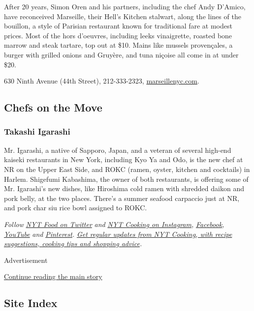 After 20 years, Simon Oren and his partners, including the chef Andy
D'Amico, have reconceived Marseille, their Hell's Kitchen stalwart,
along the lines of the bouillon, a style of Parisian restaurant known
for traditional fare at modest prices. Most of the hors d'oeuvres,
including leeks vinaigrette, roasted bone marrow and steak tartare, top
out at \$10. Mains like mussels provençales, a burger with grilled
onions and Gruyère, and tuna niçoise all come in at under \$20.

630 Ninth Avenue (44th Street), 212-333-2323,
\href{https://marseillenyc.com/}{marseillenyc.com}.

\hypertarget{chefs-on-the-move}{%
\subsection{Chefs on the Move}\label{chefs-on-the-move}}

\hypertarget{takashi-igarashi-}{%
\subsubsection{Takashi Igarashi }\label{takashi-igarashi-}}

Mr. Igarashi, a native of Sapporo, Japan, and a veteran of several
high-end kaiseki restaurants in New York, including Kyo Ya and Odo, is
the new chef at NR on the Upper East Side, and ROKC (ramen, oyster,
kitchen and cocktails) in Harlem. Shigefumi Kabashima, the owner of both
restaurants, is offering some of Mr. Igarashi's new dishes, like
Hiroshima cold ramen with shredded daikon and pork belly, at the two
places. There's a summer seafood carpaccio just at NR, and pork char siu
rice bowl assigned to ROKC.

\emph{Follow} \href{https://twitter.com/nytfood}{\emph{NYT Food on
Twitter}} \emph{and}
\href{https://www.instagram.com/nytcooking/}{\emph{NYT Cooking on
Instagram}}\emph{,}
\href{https://www.facebook.com/nytcooking/}{\emph{Facebook}}\emph{,}
\href{https://www.youtube.com/nytcooking}{\emph{YouTube}} \emph{and}
\href{https://www.pinterest.com/nytcooking/}{\emph{Pinterest}}\emph{.}
\href{https://www.nytimes.com/newsletters/cooking}{\emph{Get regular
updates from NYT Cooking, with recipe suggestions, cooking tips and
shopping advice}}\emph{.}

Advertisement

\protect\hyperlink{after-bottom}{Continue reading the main story}

\hypertarget{site-index}{%
\subsection{Site Index}\label{site-index}}

